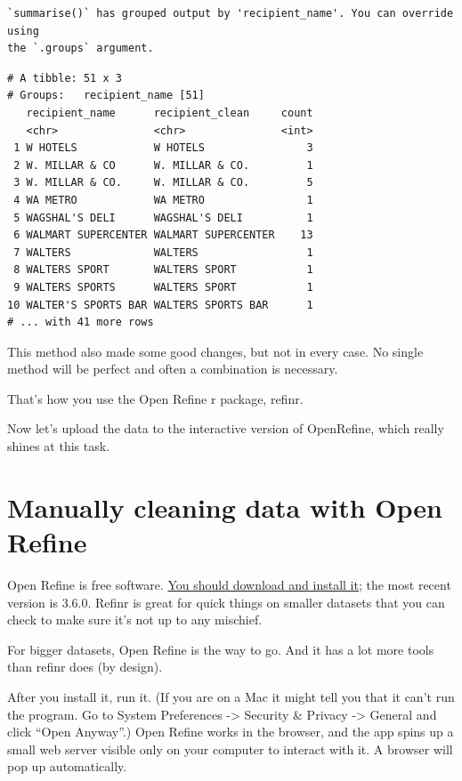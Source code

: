 \documentclass[
  letterpaper,
  DIV=11,
  numbers=noendperiod]{scrreprt}
\begin{document}
\begin{verbatim}
`summarise()` has grouped output by 'recipient_name'. You can override using
the `.groups` argument.
\end{verbatim}

\begin{verbatim}
# A tibble: 51 x 3
# Groups:   recipient_name [51]
   recipient_name      recipient_clean     count
   <chr>               <chr>               <int>
 1 W HOTELS            W HOTELS                3
 2 W. MILLAR & CO      W. MILLAR & CO.         1
 3 W. MILLAR & CO.     W. MILLAR & CO.         5
 4 WA METRO            WA METRO                1
 5 WAGSHAL'S DELI      WAGSHAL'S DELI          1
 6 WALMART SUPERCENTER WALMART SUPERCENTER    13
 7 WALTERS             WALTERS                 1
 8 WALTERS SPORT       WALTERS SPORT           1
 9 WALTERS SPORTS      WALTERS SPORT           1
10 WALTER'S SPORTS BAR WALTERS SPORTS BAR      1
# ... with 41 more rows
\end{verbatim}

This method also made some good changes, but not in every case. No
single method will be perfect and often a combination is necessary.

That's how you use the Open Refine r package, refinr.

Now let's upload the data to the interactive version of OpenRefine,
which really shines at this task.

\hypertarget{manually-cleaning-data-with-open-refine}{%
\section{Manually cleaning data with Open
Refine}\label{manually-cleaning-data-with-open-refine}}

Open Refine is free software. \href{https://openrefine.org/}{You should
download and install it}; the most recent version is 3.6.0. Refinr is
great for quick things on smaller datasets that you can check to make
sure it's not up to any mischief.

For bigger datasets, Open Refine is the way to go. And it has a lot more
tools than refinr does (by design).

After you install it, run it. (If you are on a Mac it might tell you
that it can't run the program. Go to System Preferences -\textgreater{}
Security \& Privacy -\textgreater{} General and click ``Open Anyway''.)
Open Refine works in the browser, and the app spins up a small web
server visible only on your computer to interact with it. A browser will
pop up automatically.
\end{document}
